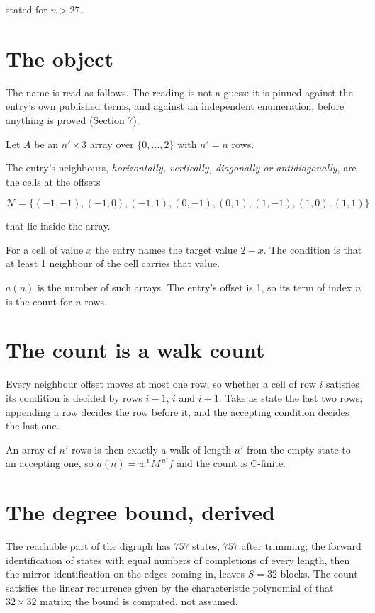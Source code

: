 \documentclass[11pt]{article}
\theoremstyle{definition}
\begin{document}
stated for $n > 27$.

\section{The object}

The name is read as follows. The reading is not a guess: it is pinned against the entry's own published terms, and against an independent enumeration, before anything is proved (Section 7).

Let $A$ be an $n' \times 3$ array over $\{0,\dots,2\}$ with $n' = n$ rows.

The entry's neighbours, {\itshape horizontally, vertically, diagonally or antidiagonally}, are the cells at the offsets

\[\mathcal{N} = \{(-1,-1), (-1,0), (-1,1), (0,-1), (0,1), (1,-1), (1,0), (1,1)\}\]

that lie inside the array.

For a cell of value $x$ the entry names the target value $2 - x$. The condition is that at least 1 neighbour of the cell carries that value.

$a(n)$ is the number of such arrays. The entry's offset is 1, so its term of index $n$ is the count for $n$ rows.

\section{The count is a walk count}

Every neighbour offset moves at most one row, so whether a cell of row $i$ satisfies its condition is decided by rows $i-1$, $i$ and $i+1$. Take as state the last two rows; appending a row decides the row before it, and the accepting condition decides the last one.

An array of $n'$ rows is then exactly a walk of length $n'$ from the empty state to an accepting one, so $a(n) = w^{\mathsf T}M^{\,n'}f$ and the count is C-finite.

\section{The degree bound, derived}

The reachable part of the digraph has $757$ states, $757$ after trimming; the forward identification of states with equal numbers of completions of every length, then the mirror identification on the edges coming in, leaves $S = 32$ blocks. The count satisfies the linear recurrence given by the characteristic polynomial of that $32\times32$ matrix; the bound is computed, not assumed.
\end{document}
